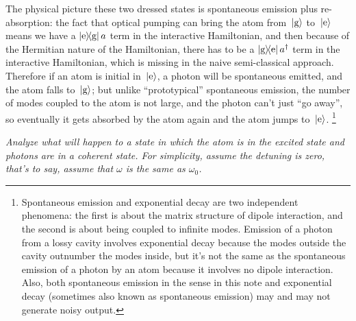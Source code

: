 \documentclass[hyperref, a4paper]{article}
\newcommand*{\kete}{\ket*{\text{e}}}
\newcommand*{\ketg}{\ket*{\text{g}}}
\newcommand*{\dyadeg}{\dyad{\text{e}}{\text{g}}}
\newcommand*{\dyadge}{\dyad{\text{g}}{\text{e}}}
\begin{document}
The physical picture these two dressed states is spontaneous emission plus re-absorption:
the fact that optical pumping can bring the atom from $\ketg$ to $\kete$ 
means we have a $\dyadeg a$ term in the interactive Hamiltonian,
and then because of the Hermitian nature of the Hamiltonian,
there has to be a $\dyadge a^\dag$ term in the interactive Hamiltonian,
which is missing in the naive semi-classical approach. 
Therefore if an atom is initial in $\kete$, 
a photon will be spontaneous emitted, and the atom falls to $\ketg$;
but unlike ``prototypical'' spontaneous emission,
the number of modes coupled to the atom is not large,
and the photon can't just ``go away'', 
so eventually it gets absorbed by the atom again and the atom jumps to $\kete$.%
\footnote{
    Spontaneous emission and exponential decay are two independent phenomena:
    the first is about the matrix structure of dipole interaction,
    and the second is about being coupled to infinite modes.
    Emission of a photon from a lossy cavity involves exponential decay 
    because the modes outside the cavity outnumber the modes inside,
    but it's not the same as the spontaneous emission of a photon by an atom 
    because it involves no dipole interaction.
    Also, both spontaneous emission in the sense in this note 
    and exponential decay (sometimes also known as spontaneous emission)
    may and may not generate noisy output.
}

\textit{Analyze what will happen to a state in which the atom is in the excited state  
and photons are in a coherent state.
For simplicity, assume the detuning is zero, that's to say,
assume that $\omega$ is the same as $\omega_0$.}
\end{document}
